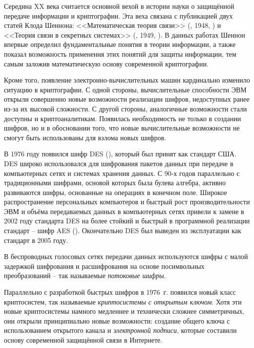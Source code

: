 Середина XX века считается основной вехой в истории науки о защищённой передаче информации и криптографии. Эта веха связана с публикацией двух статей Клода Шеннона: <<Математическая теория связи>> (, 1948, \cite{Shannon:1948:MTCa, Shannon:1948:MTCb}) и <<Теория связи в секретных системах>> (, 1949, \cite{Shannon:1949:CTS}). В данных работах Шеннон впервые определил фундаментальные понятия в теории информации, а также показал возможность применения этих понятий для защиты информации, тем самым заложив математическую основу современной криптографии.

Кроме того, появление электронно-вычислительных машин кардинально изменило ситуацию в криптографии. С одной стороны, вычислительные способности ЭВМ открыли совершенно новые возможности реализации шифров, недоступных ранее из-за их высокой сложности. С другой стороны, аналогичные возможности стали доступны и криптоаналитикам. Появилась необходимость не только в создании шифров, но и в обосновании того, что новые вычислительные возможности не смогут быть использованы для взлома новых шифров.

В 1976 году появился шифр DES (), который был принят как стандарт США. DES широко использовался для шифрования пакетов данных при передаче в компьютерных сетях и системах хранения данных. С 90-х годов параллельно с традиционными шифрами, основой которых была булева алгебра, активно развиваются шифры, основанные на операциях в конечном поле. Широкое распространение персональных компьютеров и быстрый рост производительности ЭВМ и объёма передаваемых данных в компьютерных сетях привели к замене в 2002 году стандарта DES на более стойкий и быстрый в программной реализации стандарт -- шифр AES (). Окончательно DES был выведен из эксплуатации как стандарт в 2005 году.

В беспроводных голосовых сетях передачи данных используются шифры с малой задержкой шифрования и расшифрования на основе посимвольных преобразований -- так называемые \emph{потоковые шифры}.

Параллельно с разработкой быстрых шифров в 1976~г. появился новый класс криптосистем, так называемые \emph{криптосистемы с открытым ключом}. Хотя эти новые криптосистемы намного медленнее и технически сложнее симметричных, они открыли принципиально новые возможности: создание общего ключа с использованием открытого канала и \emph{электронной подписи}, которые составили основу современной защищённой связи в Интернете.

